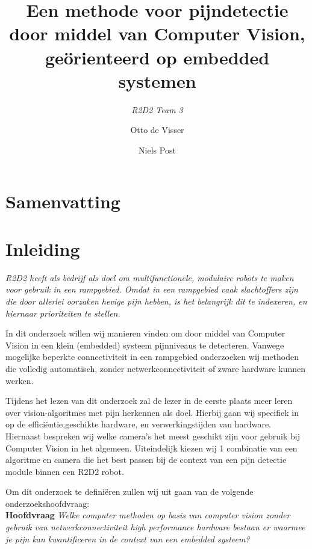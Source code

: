 \documentclass[11pt]{article}
\title{Een methode voor pijndetectie door middel van Computer Vision, geörienteerd op embedded systemen}
\author{\emph{R2D2 Team 3} \and Otto de Visser \and Niels Post}
\begin{document}
    \maketitle

    \clearpage
    \renewcommand{\contentsname}{Inhoudsopgave}
    \tableofcontents

    \clearpage


    \section{Samenvatting}


    \section{Inleiding}
    \emph{R2D2 heeft als bedrijf als doel om multifunctionele, modulaire robots te maken voor gebruik in een rampgebied.
    Omdat in een rampgebied vaak slachtoffers zijn die door allerlei oorzaken hevige pijn hebben,
    is het belangrijk dit te indexeren, en hiernaar prioriteiten te stellen.}

    In dit onderzoek willen wij manieren vinden om door middel van Computer Vision in een klein (embedded) systeem pijnniveaus
    te detecteren.
    Vanwege mogelijke beperkte connectiviteit in een rampgebied onderzoeken wij methoden die volledig automatisch,
    zonder netwerkconnectiviteit of zware hardware kunnen werken.

    Tijdens het lezen van dit onderzoek zal de lezer in de eerste plaats meer leren over vision-algoritmes met pijn
    herkennen als doel.
    Hierbij gaan wij specifiek in op de efficiëntie,geschikte hardware, en verwerkingstijden van hardware.
    Hiernaast bespreken wij welke camera’s het meest geschikt zijn voor gebruik bij Computer Vision in het algemeen.
    Uiteindelijk kiezen wij 1 combinatie van een algoritme en camera die het best passen bij de context van een pijn
    detectie module binnen een R2D2 robot.


    Om dit onderzoek te definiëren zullen wij uit gaan van de volgende onderzoekshoofdvraag:\\

    \textbf{Hoofdvraag} \hspace{5pt} \emph{Welke computer methoden op basis van computer vision zonder gebruik van netwerkconnectiviteit high
    performance hardware bestaan er waarmee je pijn kan kwantificeren in de context van een embedded systeem?}

    \bigskip
\end{document}
